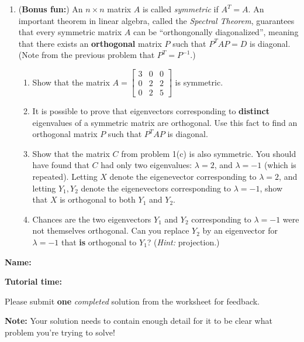 \documentclass[12pt]{article}
\newcommand{\bbm}{\begin{bmatrix}}
\newcommand{\ebm}{\end{bmatrix}}
\begin{document}
\begin{enumerate}
\item (\textbf{Bonus fun:}) An $n\times n$ matrix $A$ is called \textit{symmetric} if $A^T=A$. An important theorem in linear algebra, called the \textit{Spectral Theorem}, guarantees that every symmetric matrix $A$ can be ``orthongonally diagonalized'', meaning that there exists an \textbf{orthogonal} matrix $P$ such that $P^TAP = D$ is diagonal. (Note from the previous problem that $P^T=P^{-1}$.)
\begin{enumerate}
 \item Show that the matrix $A = \bbm 3&0&0\\0&2&2\\0&2&5\ebm$ is symmetric.
 \item It is possible to prove that eigenvectors corresponding to \textbf{distinct} eigenvalues of a symmetric matrix are orthogonal. Use this fact to find an orthogonal matrix $P$ such that $P^TAP$ is diagonal.
 \item Show that the matrix $C$ from problem 1(c) is also symmetric. You should have found that $C$ had only two eigenvalues: $\lambda =2$, and $\lambda = -1$ (which is repeated). Letting $X$ denote the eigenevector corresponding to $\lambda=2$, and letting $Y_1, Y_2$ denote the eigenevectors corresponding to $\lambda = -1$, show that $X$ is orthogonal to both $Y_1$ and $Y_2$.
 \item Chances are the two eigenvectors $Y_1$ and $Y_2$ corresponding to $\lambda = -1$ were not themselves orthogonal. Can you replace $Y_2$ by an eigenvector for $\lambda = -1$ that \textbf{is} orthogonal to $Y_1$? (\textit{Hint:} projection.)
\end{enumerate}

 \end{enumerate}

\newpage

{\large \bf Name:}

\vspace{24pt}

{\large \bf Tutorial time:}

\vspace{24pt}

Please submit \textbf{one} \textit{completed} solution from the worksheet for feedback. 

\textbf{Note:} Your solution needs to contain enough detail for it to be clear what problem you're trying to solve!
\end{document}
